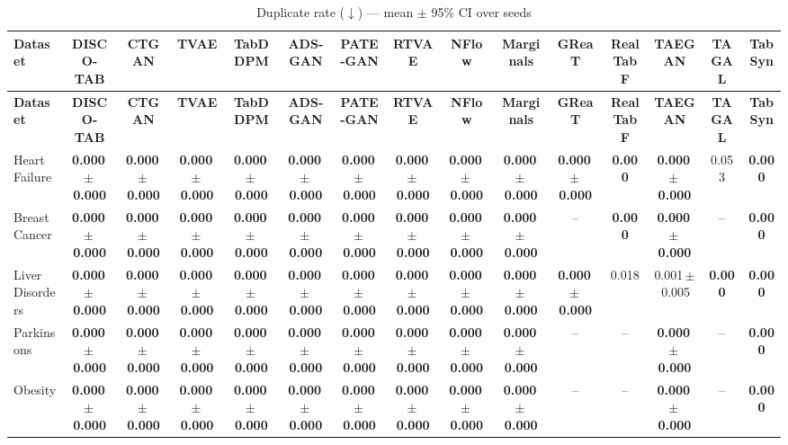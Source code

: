 \documentclass[8pt]{extarticle}
\begin{document}
\begin{longtable}{l*{14}{c}}
\caption{Duplicate rate ($\downarrow$) --- mean $\pm$ 95\% CI over seeds}\\
\toprule
\textbf{Dataset} & \textbf{DISCO-TAB} & \textbf{CTGAN} & \textbf{TVAE} & \textbf{TabDDPM} & \textbf{ADS-GAN} & \textbf{PATE-GAN} & \textbf{RTVAE} & \textbf{NFlow} & \textbf{Marginals} & \textbf{GReaT} & \textbf{RealTabF} & \textbf{TAEGAN} & \textbf{TAGAL} & \textbf{TabSyn} \\
\midrule
\endfirsthead
\toprule
\textbf{Dataset} & \textbf{DISCO-TAB} & \textbf{CTGAN} & \textbf{TVAE} & \textbf{TabDDPM} & \textbf{ADS-GAN} & \textbf{PATE-GAN} & \textbf{RTVAE} & \textbf{NFlow} & \textbf{Marginals} & \textbf{GReaT} & \textbf{RealTabF} & \textbf{TAEGAN} & \textbf{TAGAL} & \textbf{TabSyn} \\
\midrule
\endhead
\bottomrule
\endfoot
Heart Failure & \textbf{0.000\,$\pm$\,0.000} & \textbf{0.000\,$\pm$\,0.000} & \textbf{0.000\,$\pm$\,0.000} & \textbf{0.000\,$\pm$\,0.000} & \textbf{0.000\,$\pm$\,0.000} & \textbf{0.000\,$\pm$\,0.000} & \textbf{0.000\,$\pm$\,0.000} & \textbf{0.000\,$\pm$\,0.000} & \textbf{0.000\,$\pm$\,0.000} & \textbf{0.000\,$\pm$\,0.000} & \textbf{0.000} & \textbf{0.000\,$\pm$\,0.000} & 0.053 & \textbf{0.000} \\
Breast Cancer & \textbf{0.000\,$\pm$\,0.000} & \textbf{0.000\,$\pm$\,0.000} & \textbf{0.000\,$\pm$\,0.000} & \textbf{0.000\,$\pm$\,0.000} & \textbf{0.000\,$\pm$\,0.000} & \textbf{0.000\,$\pm$\,0.000} & \textbf{0.000\,$\pm$\,0.000} & \textbf{0.000\,$\pm$\,0.000} & \textbf{0.000\,$\pm$\,0.000} & -- & \textbf{0.000} & \textbf{0.000\,$\pm$\,0.000} & -- & \textbf{0.000} \\
Liver Disorders & \textbf{0.000\,$\pm$\,0.000} & \textbf{0.000\,$\pm$\,0.000} & \textbf{0.000\,$\pm$\,0.000} & \textbf{0.000\,$\pm$\,0.000} & \textbf{0.000\,$\pm$\,0.000} & \textbf{0.000\,$\pm$\,0.000} & \textbf{0.000\,$\pm$\,0.000} & \textbf{0.000\,$\pm$\,0.000} & \textbf{0.000\,$\pm$\,0.000} & \textbf{0.000\,$\pm$\,0.000} & 0.018 & 0.001\,$\pm$\,0.005 & \textbf{0.000} & \textbf{0.000} \\
Parkinsons & \textbf{0.000\,$\pm$\,0.000} & \textbf{0.000\,$\pm$\,0.000} & \textbf{0.000\,$\pm$\,0.000} & \textbf{0.000\,$\pm$\,0.000} & \textbf{0.000\,$\pm$\,0.000} & \textbf{0.000\,$\pm$\,0.000} & \textbf{0.000\,$\pm$\,0.000} & \textbf{0.000\,$\pm$\,0.000} & \textbf{0.000\,$\pm$\,0.000} & -- & -- & \textbf{0.000\,$\pm$\,0.000} & -- & \textbf{0.000} \\
Obesity & \textbf{0.000\,$\pm$\,0.000} & \textbf{0.000\,$\pm$\,0.000} & \textbf{0.000\,$\pm$\,0.000} & \textbf{0.000\,$\pm$\,0.000} & \textbf{0.000\,$\pm$\,0.000} & \textbf{0.000\,$\pm$\,0.000} & \textbf{0.000\,$\pm$\,0.000} & \textbf{0.000\,$\pm$\,0.000} & \textbf{0.000\,$\pm$\,0.000} & -- & -- & \textbf{0.000\,$\pm$\,0.000} & -- & \textbf{0.000} \\

\end{longtable}
\end{document}
